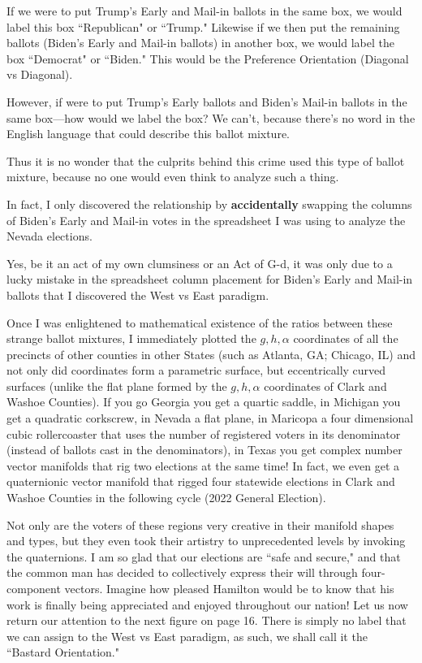 If we were to put Trump's Early and Mail-in ballots in the same box, we would label this box ``Republican" or ``Trump." Likewise if we then put the remaining ballots (Biden's Early and Mail-in ballots) in another box, we would label the box ``Democrat" or ``Biden." This would be the Preference Orientation (Diagonal vs Diagonal).

However, if were to put Trump's Early ballots and Biden's Mail-in ballots in the same box---how would we label the box? We can't, because there's no word in the English language that could describe this ballot mixture. 

Thus it is no wonder that the culprits behind this crime used this type of ballot mixture, because no one would even think to analyze such a thing. 

In fact, I only discovered the relationship by \textbf{accidentally} swapping the columns of Biden's Early and Mail-in votes in the spreadsheet I was using to analyze the Nevada elections. 

Yes, be it an act of my own clumsiness or an Act of G-d, it was only due to a lucky mistake in the spreadsheet column placement for Biden's Early and Mail-in ballots that I discovered the West vs East paradigm.

Once I was enlightened to mathematical existence of the ratios between these strange ballot mixtures, I immediately plotted the $g,h,\alpha$ coordinates of all the precincts of other counties in other States (such as Atlanta, GA; Chicago, IL) and not only did coordinates form a parametric surface, but eccentrically curved surfaces (unlike the flat plane formed by the $g,h,\alpha$ coordinates of Clark and Washoe Counties). If you go Georgia you get a quartic saddle, in Michigan you get a quadratic corkscrew, in Nevada a flat plane, in Maricopa a four dimensional cubic rollercoaster that uses the number of registered voters in its denominator (instead of ballots cast in the denominators), in Texas you get complex number vector manifolds that rig two elections at the same time! In fact, we even get a quaternionic vector manifold that rigged four statewide elections in Clark and Washoe Counties in the following cycle (2022 General Election).

Not only are the voters of these regions very creative in their manifold shapes and types, but they even took their artistry to unprecedented levels by invoking the quaternions. I am so glad that our elections are ``safe and secure," and that the common man has decided to collectively express their will through four-component vectors. Imagine how pleased Hamilton would be to know that his work is finally being appreciated and enjoyed throughout our nation!
\newpage
Let us now return our attention to the next figure on page 16. There is simply no label that we can assign to the West vs East paradigm, as such, we shall call it the ``Bastard Orientation."

